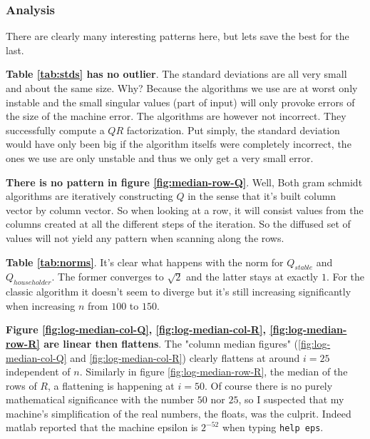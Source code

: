 \documentclass[a4paper,11pt]{article}
\begin{document}

\subsubsection{Analysis}

There are clearly many interesting patterns here, but lets save the best
for the last.

\textbf{Table \ref{tab:stds} has no outlier}. The standard deviations
are all very small and about the same size. Why? Because the algorithms
we use are at worst only instable and the small singular values (part of
input) will only provoke errors of the size of the machine error. The
algorithms are however not incorrect. They successfully compute a $QR$
factorization.  Put simply, the standard deviation would have only been
big if the algorithm itselfs were completely incorrect, the ones we use
are only unstable and thus we only get a very small error.

\textbf{There is no pattern in figure \ref{fig:median-row-Q}}. Well, Both
gram schmidt algorithms are iteratively constructing $Q$ in the sense
that it's built column vector by column vector. So when looking at a row,
it will consist values from the columns created at all the different
steps of the iteration. So the diffused set of values will not yield any
pattern when scanning along the rows.

\textbf{Table \ref{tab:norms}}. It's clear what happens with the norm
for $Q_{stable}$ and $Q_{householder}$. The former converges to $\sqrt{2}$
and the latter stays at exactly $1$. For the classic algorithm it
doesn't seem to diverge but it's still increasing significantly when
increasing $n$ from $100$ to $150$.

\textbf{Figure \ref{fig:log-median-col-Q}, \ref{fig:log-median-col-R},
\ref{fig:log-median-row-R} are linear then flattens}. The
"column median figures" (\ref{fig:log-median-col-Q} and
\ref{fig:log-median-col-R}) clearly flattens at around $i=25$
independent of $n$. Similarly in figure \ref{fig:log-median-row-R}, the
median of the rows of $R$, a flattening is happening at $i=50$. Of
course there is no purely mathematical significance with the number $50$
nor $25$, so I suspected that my machine's simplification of the real
numbers, the floats, was the culprit. Indeed matlab reported that
the machine epsilon is $2^{-52}$ when typing \texttt{help eps}.
\end{document}

